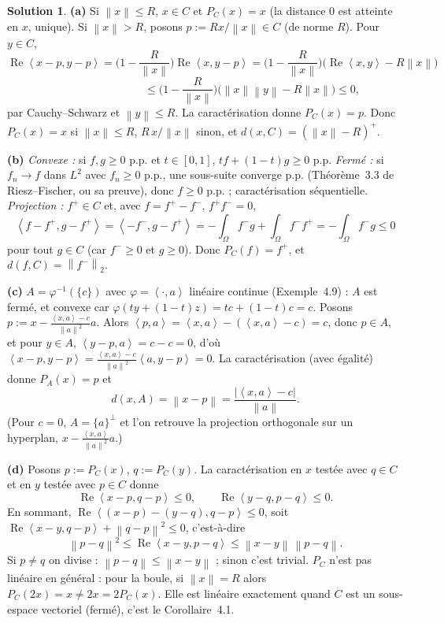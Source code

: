 \documentclass[11pt,a4paper]{article}
\newcommand{\norm}[1]{\left\|#1\right\|}
\newcommand{\ps}[2]{\left\langle #1,#2\right\rangle}
\newcommand{\ie}{c'est-à-dire}
\renewcommand{\Re}{\operatorname{Re}}
\theoremstyle{definition}
\newtheorem*{solution}{Solution}
\begin{document}
\begin{solution}
\noindent\textbf{(a)} Si $\norm x\le R$, $x\in C$ et $P_C(x)=x$ (la distance $0$ est atteinte en $x$, unique). Si $\norm x>R$, posons $p:=Rx/\norm x\in C$ (de norme $R$). Pour $y\in C$,
\[
\Re\ps{x-p}{y-p}=\Big(1-\frac R{\norm x}\Big)\Re\ps x{y-p}=\Big(1-\frac R{\norm x}\Big)\big(\Re\ps xy-R\norm x\big)
\]
\[
\phantom{\Re\ps{x-p}{y-p}}\le\Big(1-\frac R{\norm x}\Big)\big(\norm x\norm y-R\norm x\big)\le0 ,
\]
par Cauchy--Schwarz et $\norm y\le R$. La caractérisation donne $P_C(x)=p$. Donc $P_C(x)=x$ si $\norm x\le R$, $R\,x/\norm x$ sinon, et $d(x,C)=(\norm x-R)^+$.

\medskip
\noindent\textbf{(b)} \emph{Convexe :} si $f,g\ge0$ p.p. et $t\in[0,1]$, $tf+(1-t)g\ge0$ p.p. \emph{Fermé :} si $f_n\to f$ dans $L^2$ avec $f_n\ge0$ p.p., une sous-suite converge p.p. (Théorème~3.3 de Riesz--Fischer, ou sa preuve), donc $f\ge0$ p.p. ; caractérisation séquentielle. \emph{Projection :} $f^+\in C$ et, avec $f=f^+-f^-$, $f^+f^-=0$,
\[
\ps{f-f^+}{g-f^+}=\ps{-f^-}{g-f^+}=-\int_\Omega f^-g+\int_\Omega f^-f^+=-\int_\Omega f^-g\le0
\]
pour tout $g\in C$ (car $f^-\ge0$ et $g\ge0$). Donc $P_C(f)=f^+$, et $d(f,C)=\norm{f^-}_2$.

\medskip
\noindent\textbf{(c)} $A=\varphi^{-1}(\{c\})$ avec $\varphi=\ps\cdot a$ linéaire continue (Exemple~4.9) : $A$ est fermé, et convexe car $\varphi(ty+(1-t)z)=tc+(1-t)c=c$. Posons $p:=x-\frac{\ps xa-c}{\norm a^2}a$. Alors $\ps pa=\ps xa-(\ps xa-c)=c$, donc $p\in A$, et pour $y\in A$, $\ps{y-p}a=c-c=0$, d'où $\ps{x-p}{y-p}=\frac{\ps xa-c}{\norm a^2}\ps a{y-p}=0$. La caractérisation (avec égalité) donne $P_A(x)=p$ et
\[
d(x,A)=\norm{x-p}=\frac{|\ps xa-c|}{\norm a} .
\]
(Pour $c=0$, $A=\{a\}^\perp$ et l'on retrouve la projection orthogonale sur un hyperplan, $x-\frac{\ps xa}{\norm a^2}a$.)

\medskip
\noindent\textbf{(d)} Posons $p:=P_C(x)$, $q:=P_C(y)$. La caractérisation en $x$ testée avec $q\in C$ et en $y$ testée avec $p\in C$ donne
\[
\Re\ps{x-p}{q-p}\le0,\qquad\Re\ps{y-q}{p-q}\le0 .
\]
En sommant, $\Re\ps{(x-p)-(y-q)}{q-p}\le0$, soit $\Re\ps{x-y}{q-p}+\norm{q-p}^2\le0$, \ie{}
\[
\norm{p-q}^2\le\Re\ps{x-y}{p-q}\le\norm{x-y}\,\norm{p-q} .
\]
Si $p\ne q$ on divise : $\norm{p-q}\le\norm{x-y}$ ; sinon c'est trivial. $P_C$ n'est pas linéaire en général : pour la boule, si $\norm x=R$ alors $P_C(2x)=x\ne2x=2P_C(x)$. Elle est linéaire exactement quand $C$ est un sous-espace vectoriel (fermé), c'est le Corollaire~4.1.
\end{solution}
\end{document}
